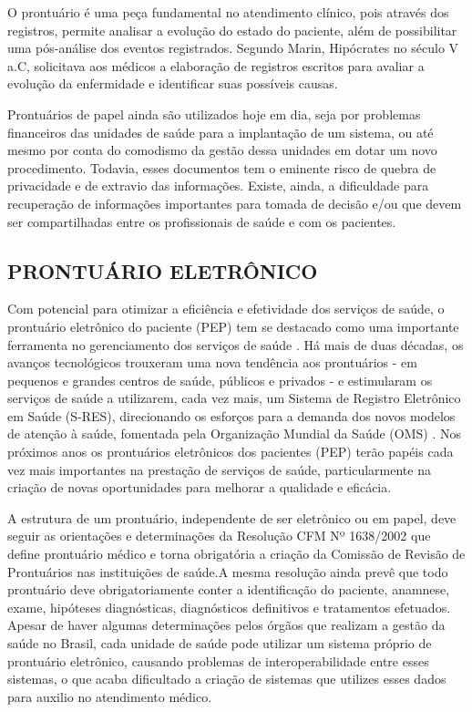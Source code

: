 O prontuário é uma peça fundamental no atendimento clínico, pois através dos registros, permite analisar a evolução do estado do paciente, além de possibilitar uma pós-análise dos eventos registrados.
Segundo Marin\cite{MARIN}, Hipócrates no século V a.C, solicitava aos médicos a elaboração de registros escritos para avaliar a evolução da enfermidade e identificar suas possíveis causas. 

Prontuários de papel ainda são utilizados hoje em dia, seja por problemas financeiros das unidades de saúde para a implantação de um sistema, ou até mesmo por conta do comodismo da gestão dessa unidades em dotar um novo procedimento. Todavia, esses documentos tem o eminente risco de quebra de privacidade e de extravio das informações. Existe, ainda, a dificuldade para recuperação de informações importantes para tomada de decisão e/ou que devem ser compartilhadas entre os profissionais de saúde e com os pacientes.\cite{SALVADOR}

\subsection{PRONTUÁRIO ELETRÔNICO}

Com potencial para otimizar a eficiência e efetividade dos serviços de saúde, o prontuário eletrônico do paciente (PEP) tem se destacado como uma importante ferramenta no gerenciamento dos serviços de saúde
\cite{GONCALVES}.  Há mais de duas décadas, os avanços tecnológicos trouxeram uma nova tendência aos prontuários - em pequenos e grandes centros de saúde, públicos e privados - e estimularam os serviços de saúde a utilizarem, cada vez mais, um Sistema de Registro Eletrônico em Saúde (S-RES), direcionando os esforços para a demanda dos novos modelos de atenção à saúde, fomentada pela Organização Mundial da Saúde (OMS) \cite{Downing}. Nos próximos anos os prontuários eletrônicos dos pacientes (PEP) terão papéis cada vez mais importantes na prestação de serviços de saúde, particularmente na criação de novas oportunidades para melhorar a qualidade e eficácia.\cite{Downing}

A estrutura de um prontuário, independente de ser eletrônico ou em papel, deve seguir as orientações e determinações da Resolução CFM Nº 1638/2002 que define prontuário médico e torna obrigatória a criação da Comissão de Revisão de Prontuários nas instituições de saúde.\cite{SIBIS}A mesma resolução ainda prevê que todo prontuário deve obrigatoriamente conter a identificação do paciente, anamnese, exame, hipóteses diagnósticas, diagnósticos definitivos e tratamentos efetuados. Apesar de haver algumas determinações pelos órgãos que realizam a gestão da saúde no Brasil, cada unidade de saúde pode utilizar um sistema próprio de prontuário eletrônico, causando problemas de interoperabilidade entre esses sistemas, o que acaba dificultado a criação de sistemas que utilizes esses dados para auxilio no atendimento médico.

